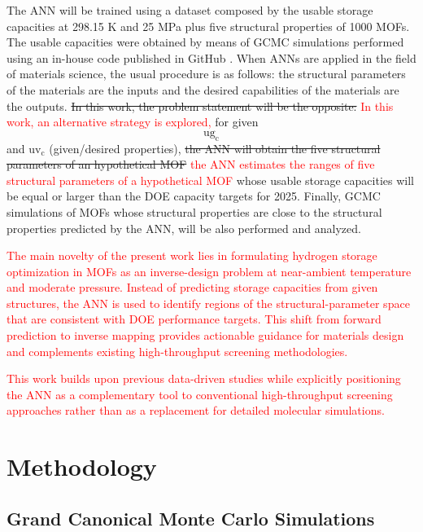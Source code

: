 \documentclass[review]{elsarticle}
\newcommand{\ugc}{$\mathrm{ug_c}$}
\newcommand{\uvc}{\mathrm{uv_c}}
\begin{document}
The ANN will be trained using a dataset composed by the usable storage capacities at 298.15 K and 25 MPa plus five structural properties of 1000 MOFs. The usable capacities were obtained by means of GCMC simulations performed using an in-house code published in GitHub \cite{mcmgs}.
When ANNs are applied in the field of materials science, the usual procedure is as follows: the structural parameters of the materials are the inputs and the desired capabilities of the materials are the outputs. \sout{In this work, the problem statement will be the opposite:}
\textcolor{red}{In this work, an alternative strategy is explored,}
for given $\ugc$ and $\uvc$ (given/desired properties), \sout{the ANN will obtain the five structural parameters of an hypothetical MOF}
\textcolor{red}{the ANN estimates the ranges of five structural parameters of a hypothetical MOF} whose usable storage capacities will be equal or larger than the DOE capacity targets for 2025. Finally, GCMC simulations of MOFs whose structural properties are close to the structural properties predicted by the ANN, will be also performed and analyzed.

\textcolor{red}{The main novelty of the present work lies in formulating hydrogen storage optimization in MOFs as an inverse-design problem at near-ambient temperature and moderate pressure. Instead of predicting storage capacities from given structures, the ANN is used to identify regions of the structural-parameter space that are consistent with DOE performance targets. This shift from forward prediction to inverse mapping provides actionable guidance for materials design and complements existing high-throughput screening methodologies.
}


\textcolor{red}{
This work builds upon previous data-driven studies while explicitly positioning the ANN as a complementary tool to conventional high-throughput screening approaches rather than as a replacement for detailed molecular simulations.}


\section{Methodology}

\subsection{Grand Canonical Monte Carlo Simulations}
\end{document}
